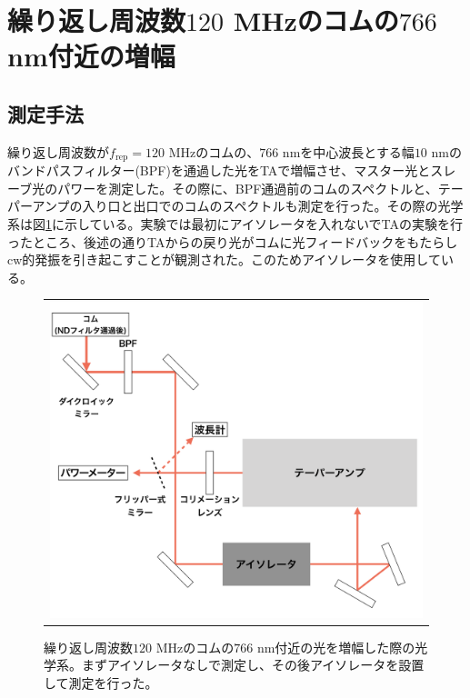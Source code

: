 \documentclass[uplatex, dvipdfmx, a4paper, report, papersize, 11pt]{jsbook}
\begin{document}
\newpage
\section{繰り返し周波数$120$ MHzのコムの$766$ nm付近の増幅}
\subsection{測定手法}
繰り返し周波数が$f_{\mathrm{rep}} = 120$ MHzのコムの、$766$ nmを中心波長とする幅$10$ nmのバンドパスフィルター(BPF)を通過した光をTAで増幅させ、マスター光とスレーブ光のパワーを測定した。その際に、BPF通過前のコムのスペクトルと、テーパーアンプの入り口と出口でのコムのスペクトルも測定を行った。その際の光学系は図\ref{760_amp_diagram}に示している。実験では最初にアイソレータを入れないでTAの実験を行ったところ、後述の通りTAからの戻り光がコムに光フィードバックをもたらしcw的発振を引き起こすことが観測された。このためアイソレータを使用している。

\begin{figure}[htpb]
  \centering
    \begin{tabular}{c}
      \begin{minipage}{1\hsize}
        \centering
          \includegraphics[keepaspectratio,  scale=0.4,  angle=0]
                          {figures/chapter4/760_amp_diagram.png}
                          \caption{繰り返し周波数$120$ MHzのコムの$766$ nm付近の光を増幅した際の光学系。まずアイソレータなしで測定し、その後アイソレータを設置して測定を行った。}
                          \label{760_amp_diagram}
      \end{minipage}
    \end{tabular}
\end{figure}
\end{document}
